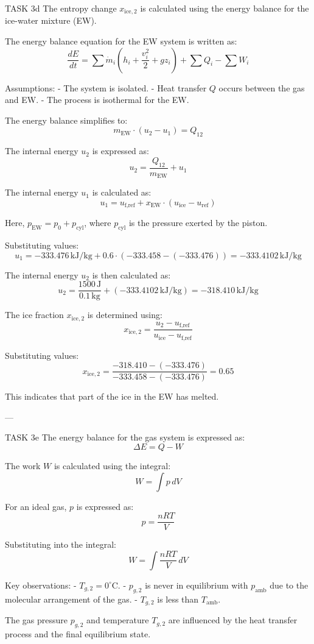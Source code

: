 TASK 3d  
The entropy change \( x_{\text{ice},2} \) is calculated using the energy balance for the ice-water mixture (EW).  

The energy balance equation for the EW system is written as:  
\[
\frac{dE}{dt} = \sum \dot{m}_i \left( h_i + \frac{v_i^2}{2} + g z_i \right) + \sum Q_i - \sum W_i
\]  

Assumptions:  
- The system is isolated.  
- Heat transfer \( Q \) occurs between the gas and EW.  
- The process is isothermal for the EW.  

The energy balance simplifies to:  
\[
m_{\text{EW}} \cdot (u_2 - u_1) = Q_{12}
\]  

The internal energy \( u_2 \) is expressed as:  
\[
u_2 = \frac{Q_{12}}{m_{\text{EW}}} + u_1
\]  

The internal energy \( u_1 \) is calculated as:  
\[
u_1 = u_{\text{f,ref}} + x_{\text{EW}} \cdot (u_{\text{ice}} - u_{\text{ref}})
\]  

Here, \( p_{\text{EW}} = p_0 + p_{\text{cyl}} \), where \( p_{\text{cyl}} \) is the pressure exerted by the piston.  

Substituting values:  
\[
u_1 = -333.476 \, \text{kJ/kg} + 0.6 \cdot (-333.458 - (-333.476)) = -333.4102 \, \text{kJ/kg}
\]  

The internal energy \( u_2 \) is then calculated as:  
\[
u_2 = \frac{1500 \, \text{J}}{0.1 \, \text{kg}} + (-333.4102 \, \text{kJ/kg}) = -318.410 \, \text{kJ/kg}
\]  

The ice fraction \( x_{\text{ice},2} \) is determined using:  
\[
x_{\text{ice},2} = \frac{u_2 - u_{\text{f,ref}}}{u_{\text{ice}} - u_{\text{f,ref}}}
\]  

Substituting values:  
\[
x_{\text{ice},2} = \frac{-318.410 - (-333.476)}{-333.458 - (-333.476)} = 0.65
\]  

This indicates that part of the ice in the EW has melted.  

---

TASK 3e  
The energy balance for the gas system is expressed as:  
\[
\Delta E = Q - W
\]  

The work \( W \) is calculated using the integral:  
\[
W = \int p \, dV
\]  

For an ideal gas, \( p \) is expressed as:  
\[
p = \frac{nRT}{V}
\]  

Substituting into the integral:  
\[
W = \int \frac{nRT}{V} \, dV
\]  

Key observations:  
- \( T_{g,2} = 0^\circ\text{C} \).  
- \( p_{g,2} \) is never in equilibrium with \( p_{\text{amb}} \) due to the molecular arrangement of the gas.  
- \( T_{g,2} \) is less than \( T_{\text{amb}} \).  

The gas pressure \( p_{g,2} \) and temperature \( T_{g,2} \) are influenced by the heat transfer process and the final equilibrium state.